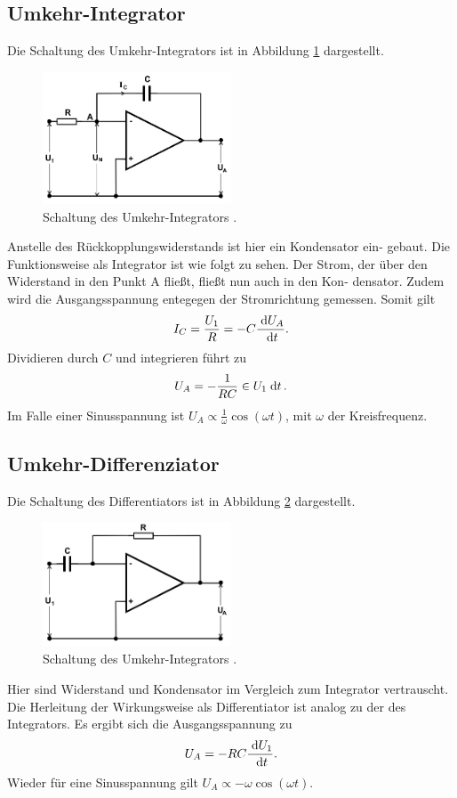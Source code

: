 \subsection{Umkehr-Integrator}
\label{sec:int}
Die Schaltung des Umkehr-Integrators ist in
Abbildung \ref{pic:umInt} dargestellt. 
\begin{figure}[t]
 \includegraphics[width = 0.5\textwidth]{../pics/umkehrInt.png}
 \caption{Schaltung des Umkehr-Integrators \cite{Anl}.}
 \label{pic:umInt}
\end{figure}
Anstelle des Rückkopplungswiderstands ist hier ein Kondensator ein-
gebaut. Die Funktionsweise als Integrator ist
wie folgt zu sehen.
Der Strom, der über den Widerstand in den
Punkt A fließt, fließt nun auch in den Kon-
densator. Zudem wird die Ausgangsspannung
entegegen der Stromrichtung gemessen. Somit
gilt
\begin{align}
 I_C = \frac{U_1}{R} = -C \frac{\; \mathrm{d} U_A}{\; \mathrm{d} t}.
\end{align}
Dividieren durch $C$ und integrieren führt zu
\begin{align}
 U_A = -\frac{1}{RC} \in U_1 \; \mathrm{d} t\,.
\end{align}
Im Falle einer Sinusspannung ist $U_A\propto \frac{1}{\omega} \cos(\omega t)$,
mit $\omega$ der Kreisfrequenz.

\subsection{Umkehr-Differenziator}
\label{sec:diff}
Die Schaltung des Differentiators ist in Abbildung \ref{pic:umDiff}
dargestellt.
\begin{figure}[t]
 \includegraphics[width = 0.5\textwidth]{../pics/umkehrDiff.png}
 \caption{Schaltung des Umkehr-Integrators \cite{Anl}.}
 \label{pic:umDiff}
\end{figure}
Hier sind Widerstand 
und Kondensator im Vergleich zum
Integrator vertrauscht. Die Herleitung der Wirkungsweise 
als Differentiator ist analog zu der
des Integrators. Es ergibt sich die Ausgangsspannung zu
\begin{align}
 U_A = -RC \frac{\; \mathrm{d} U_1}{\; \mathrm{d} t}.
\end{align}
Wieder für eine Sinusspannung gilt $U_A\propto -\omega \cos(\omega t)$.


